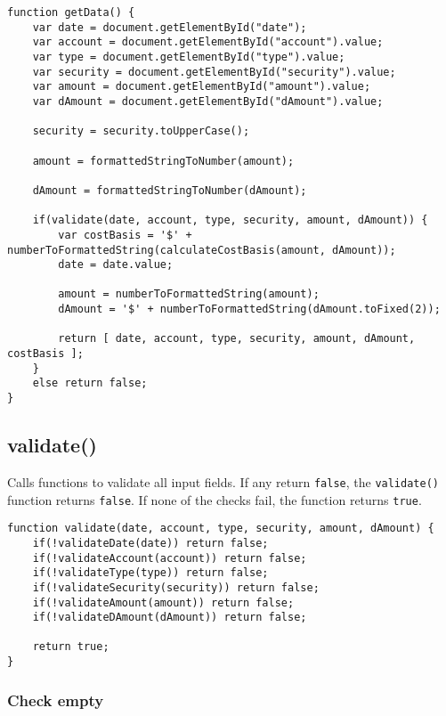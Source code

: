\documentclass[letterpaper]{article}
\begin{document}
\begin{lstlisting}[firstnumber=21]
function getData() {
    var date = document.getElementById("date");
    var account = document.getElementById("account").value;
    var type = document.getElementById("type").value;
    var security = document.getElementById("security").value;
    var amount = document.getElementById("amount").value;
    var dAmount = document.getElementById("dAmount").value;

    security = security.toUpperCase();

    amount = formattedStringToNumber(amount);

    dAmount = formattedStringToNumber(dAmount);

    if(validate(date, account, type, security, amount, dAmount)) {
        var costBasis = '$' + numberToFormattedString(calculateCostBasis(amount, dAmount));
        date = date.value;

        amount = numberToFormattedString(amount);
        dAmount = '$' + numberToFormattedString(dAmount.toFixed(2));

        return [ date, account, type, security, amount, dAmount, costBasis ];
    }
    else return false;
}
\end{lstlisting}

\subsection{validate()}

Calls functions to validate all input fields.
If any return \lstinline{false}, the \lstinline{validate()} function returns \lstinline{false}.
If none of the checks fail, the function returns \lstinline{true}.

\begin{lstlisting}[firstnumber=47]
function validate(date, account, type, security, amount, dAmount) {
    if(!validateDate(date)) return false;
    if(!validateAccount(account)) return false;
    if(!validateType(type)) return false;
    if(!validateSecurity(security)) return false;
    if(!validateAmount(amount)) return false;
    if(!validateDAmount(dAmount)) return false;

    return true;
}
\end{lstlisting}

\subsubsection{Check empty}
\end{document}
